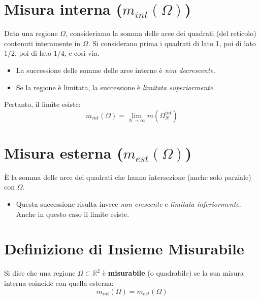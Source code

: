 \section{Misura interna ($m_{int}(\Omega)$)}
Data una regione $\Omega$, consideriamo la somma delle aree dei quadrati (del reticolo) contenuti interamente in $\Omega$.
Si considerano prima i quadrati di lato 1, poi di lato $1/2$, poi di lato $1/4$, e così via.
\begin{itemize}
    \item La successione delle somme delle aree interne è \textit{non decrescente}.
    \item Se la regione è limitata, la successione è \textit{limitata superiormente}. 
\end{itemize}
Pertanto, il limite esiste:
\[ m_{int}(\Omega) = \lim_{N \to \infty} m(\Omega_N^{int}) \]


\section{Misura esterna ($m_{est}(\Omega)$)}
È la somma delle aree dei quadrati che hanno intersezione (anche solo parziale) con $\Omega$.
\begin{itemize}
    \item Questa successione risulta invece \textit{non crescente} e \textit{limitata inferiormente}. Anche in questo caso il limite esiste.
\end{itemize}

\begin{center}
\end{center}

\section{Definizione di Insieme Misurabile}
Si dice che una regione $\Omega \subset \mathbb{R}^2$ è \textbf{misurabile} (o quadrabile) se la sua misura interna coincide con quella esterna:
\[ m_{int}(\Omega) = m_{est}(\Omega) \]

